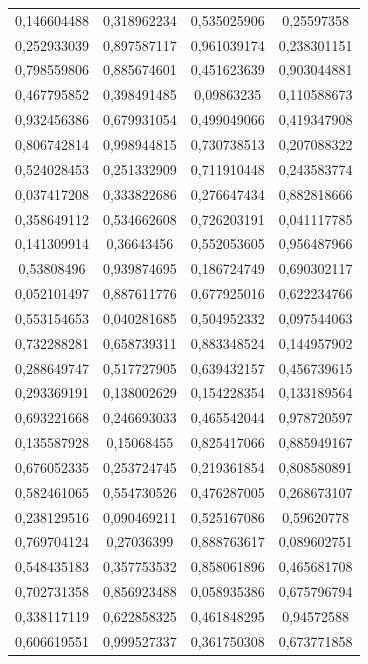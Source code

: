 \documentclass[a4paper, 12pt]{article}
\begin{document}
\begin{longtable}{|c|c|c|c|}
    0,146604488 & 0,318962234 & 0,535025906 & 0,25597358 \\
    0,252933039 & 0,897587117 & 0,961039174 & 0,238301151 \\
    0,798559806 & 0,885674601 & 0,451623639 & 0,903044881 \\
    0,467795852 & 0,398491485 & 0,09863235 & 0,110588673 \\
    0,932456386 & 0,679931054 & 0,499049066 & 0,419347908 \\
    0,806742814 & 0,998944815 & 0,730738513 & 0,207088322 \\
    0,524028453 & 0,251332909 & 0,711910448 & 0,243583774 \\
    0,037417208 & 0,333822686 & 0,276647434 & 0,882818666 \\
    0,358649112 & 0,534662608 & 0,726203191 & 0,041117785 \\
    0,141309914 & 0,36643456 & 0,552053605 & 0,956487966 \\
    0,53808496 & 0,939874695 & 0,186724749 & 0,690302117 \\
    0,052101497 & 0,887611776 & 0,677925016 & 0,622234766 \\
    0,553154653 & 0,040281685 & 0,504952332 & 0,097544063 \\
    0,732288281 & 0,658739311 & 0,883348524 & 0,144957902 \\
    0,288649747 & 0,517727905 & 0,639432157 & 0,456739615 \\
    0,293369191 & 0,138002629 & 0,154228354 & 0,133189564 \\
    0,693221668 & 0,246693033 & 0,465542044 & 0,978720597 \\
    0,135587928 & 0,15068455 & 0,825417066 & 0,885949167 \\
    0,676052335 & 0,253724745 & 0,219361854 & 0,808580891 \\
    0,582461065 & 0,554730526 & 0,476287005 & 0,268673107 \\
    0,238129516 & 0,090469211 & 0,525167086 & 0,59620778 \\
    0,769704124 & 0,27036399 & 0,888763617 & 0,089602751 \\
    0,548435183 & 0,357753532 & 0,858061896 & 0,465681708 \\
    0,702731358 & 0,856923488 & 0,058935386 & 0,675796794 \\
    0,338117119 & 0,622858325 & 0,461848295 & 0,94572588 \\
    0,606619551 & 0,999527337 & 0,361750308 & 0,673771858 \\

\end{longtable}
\end{document}
